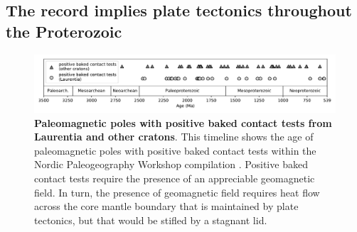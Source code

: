 \documentclass[twocolumn, switch]{article} %
\begin{document}
\subsection{The record implies plate tectonics throughout the Proterozoic}
\label{sec:plate_tectonics}

\begin{figure}
\centering
\includegraphics[width=\textwidth]{../Figures/baked_contact_timeline_all.pdf}
\caption{\textbf{Paleomagnetic poles with positive baked contact tests from Laurentia and other cratons}. This timeline shows the age of paleomagnetic poles with positive baked contact tests within the Nordic Paleogeography Workshop compilation \citep{Evans2021a}. Positive baked contact tests require the presence of an appreciable geomagnetic field. In turn, the presence of geomagnetic field requires heat flow across the core mantle boundary that is maintained by plate tectonics, but that would be stifled by a stagnant lid.}
\label{fig:baked_contact}
\end{figure}
\end{document}
